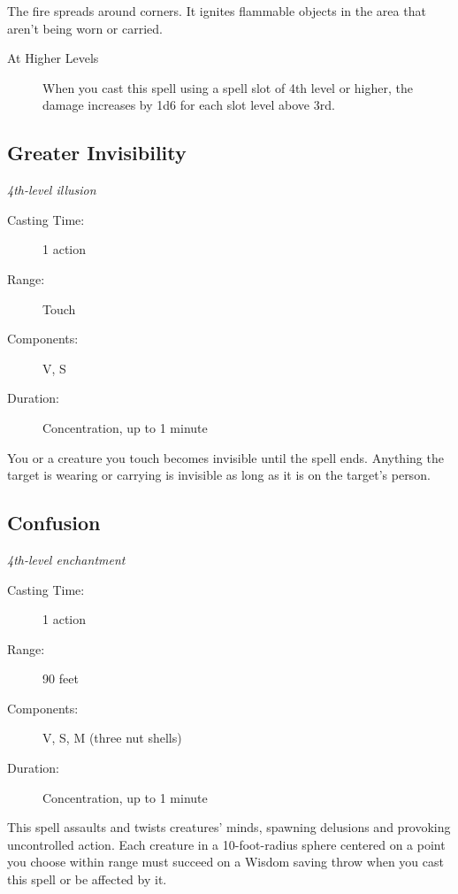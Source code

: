 \documentclass[letterpaper,10pt,twoside,twocolumn,openany]{book}
\begin{document}
The fire spreads around corners. It ignites flammable objects in the area that aren't being worn or carried. 

\begin{description}
	\item[At Higher Levels] When you cast this spell using a spell slot of 4th level or higher, the damage increases by 1d6 for each slot level above 3rd. 
\end{description}

\subsection{Greater Invisibility} \hypertarget{Greater Invisibility}{}
\begin{hangingpar}
	\textit{4th-level illusion}
\end{hangingpar}

\begin{description}
	\item[Casting Time:] 1 action
	\item[Range:] Touch 
	\item[Components:] V, S
	\item[Duration:] Concentration, up to 1 minute
\end{description}

You or a creature you touch becomes invisible until the spell ends. Anything the target is wearing or carrying is invisible as long as it is on the target's person. 

\subsection{Confusion} \hypertarget{Confusion}{}
\begin{hangingpar}
	\textit{4th-level enchantment}
\end{hangingpar}

\begin{description}
	\item[Casting Time:] 1 action
	\item[Range:] 90 feet 
	\item[Components:] V, S, M (three nut shells) 
	\item[Duration:] Concentration, up to 1 minute
\end{description}

This spell assaults and twists creatures' minds, spawning delusions and provoking uncontrolled action. Each creature in a 10-foot-radius sphere centered on a point you choose within range must succeed on a Wisdom saving throw when you cast this spell or be affected by it.
\end{document}
